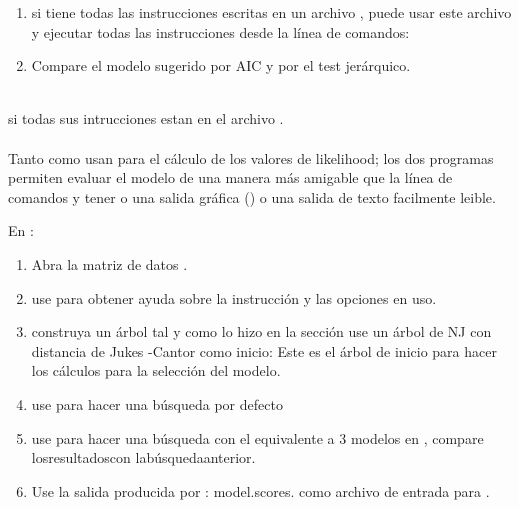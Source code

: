 {\begin{enumerate}
	\\ o cargue cada instrucci\'on por l\'inea de comandos desde un editor de texto.

	\item  si tiene todas las instrucciones escritas en un archivo , puede usar este archivo y ejecutar todas las instrucciones desde la l\'inea de comandos:
	
	\item Compare el modelo sugerido por AIC y por el test jer\'arquico.
\end{enumerate}




\\
\noindent
si todas sus intrucciones estan en el archivo .\\
\\
Tanto  como  usan  para el c\'alculo de los valores de likelihood; los dos programas permiten evaluar el modelo de una manera m\'as amigable que la l\'inea de comandos y tener o una salida gr\'afica () o una salida de texto facilmente leible.




En :

\begin{enumerate}		
	\item Abra la matriz de datos .
	\item use  para obtener ayuda sobre la instrucci\'on  y las opciones en uso.
	\item  construya un \'arbol tal y como lo hizo en la secci\'on %
	use un \'arbol de NJ con distancia de Jukes -Cantor como inicio:
	   Este es el \'arbol de inicio para hacer los c\'alculos para la selecci\'on del modelo.
	    
	\item use 
	   para hacer una b\'usqueda por defecto
	\item use 
	   para hacer una b\'usqueda con el equivalente a 3 modelos en , compare losresultadoscon lab\'usquedaanterior.

	   



	\item Use la salida producida por : model.scores. como archivo de entrada para .


\end{enumerate}}
